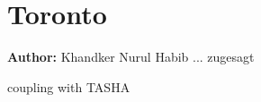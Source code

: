 \section{Toronto}
\label{ch:scenarios:toronto}
\hfill \textbf{Author:} Khandker Nurul Habib ... zugesagt

\citep[][]{GaoWEtAl_TRR_2010} coupling with TASHA

